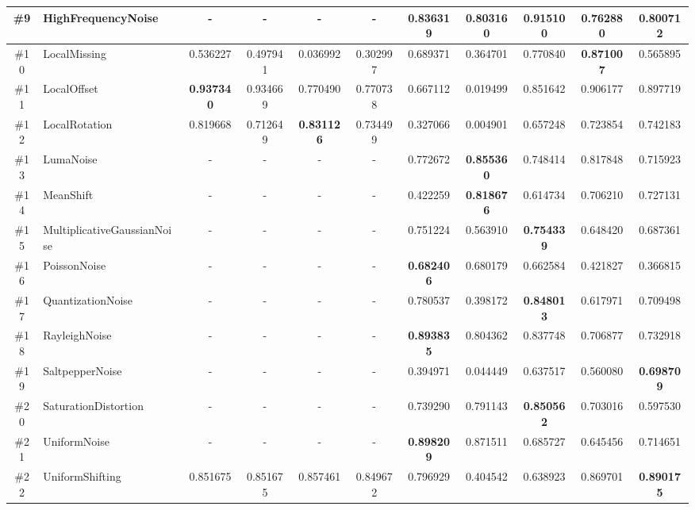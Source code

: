 \documentclass[acmsmall]{acmart}
\begin{document}
\begin{table*}[t]
{\begin{tabular}{c|p{8em}|c|c|c|c|c|c|c|c|c}
    \hline
    \#9   & HighFrequencyNoise & -     & -     & -     & -     & 0.836319 & 0.803160 & \textbf{0.915100} & 0.762880 & 0.800712  \\
    \hline
    \#10  & LocalMissing & 0.536227 & 0.497941 & 0.036992 & 0.302997 & 0.689371 & 0.364701 & 0.770840 & \textbf{0.871007} & 0.565895  \\
    \hline
    \#11  & LocalOffset & \textbf{0.937340} & 0.934669 & 0.770490 & 0.770738 & 0.667112 & 0.019499 & 0.851642 & 0.906177 & 0.897719  \\
    \hline
    \#12  & LocalRotation & 0.819668 & 0.712649 & \textbf{0.831126} & 0.734499 & 0.327066 & 0.004901 & 0.657248 & 0.723854 & 0.742183  \\
    \hline
    \#13  & LumaNoise & -     & -     & -     & -     & 0.772672 & \textbf{0.855360} & 0.748414 & 0.817848 & 0.715923  \\
    \hline
    \#14  & MeanShift & -     & -     & -     & -     & 0.422259 & \textbf{0.818676} & 0.614734 & 0.706210 & 0.727131  \\
    \hline
    \#15  & Multiplicative\newline{}GaussianNoise & -     & -     & -     & -     & 0.751224 & 0.563910 & \textbf{0.754339} & 0.648420 & 0.687361  \\
    \hline
    \#16  & PoissonNoise & -     & -     & -     & -     & \textbf{0.682406} & 0.680179 & 0.662584 & 0.421827 & 0.366815  \\
    \hline
    \#17  & QuantizationNoise & -     & -     & -     & -     & 0.780537 & 0.398172 & \textbf{0.848013} & 0.617971 & 0.709498  \\
    \hline
    \#18  & RayleighNoise & -     & -     & -     & -     & \textbf{0.893835} & 0.804362 & 0.837748 & 0.706877 & 0.732918  \\
    \hline
    \#19  & SaltpepperNoise & -     & -     & -     & -     & 0.394971 & 0.044449 & 0.637517 & 0.560080 & \textbf{0.698709 } \\
    \hline
    \#20  & SaturationDistortion & -     & -     & -     & -     & 0.739290 & 0.791143 & \textbf{0.850562} & 0.703016 & 0.597530  \\
    \hline
    \#21  & UniformNoise & -     & -     & -     & -     & \textbf{0.898209} & 0.871511 & 0.685727 & 0.645456 & 0.714651  \\
    \hline
    \#22  & UniformShifting & 0.851675 & 0.851675 & 0.857461 & 0.849672 & 0.796929 & 0.404542 & 0.638923 & 0.869701 & \textbf{0.890175 } \\
    \hline

\end{tabular}}
\end{table*}
\end{document}
